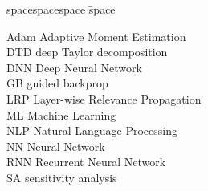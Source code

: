 
\begin{tabbing}
spacespacespace \= space \kill

Adam \> Adaptive Moment Estimation \\
DTD \> deep Taylor decomposition \\
DNN \> Deep Neural Network \\
GB  \> guided backprop \\
LRP \> Layer-wise Relevance Propagation \\
ML \> Machine Learning \\
NLP \> Natural Language Processing \\
NN \> Neural Network \\
RNN \> Recurrent Neural Network \\
SA  \> sensitivity analysis \\


\end{tabbing}

